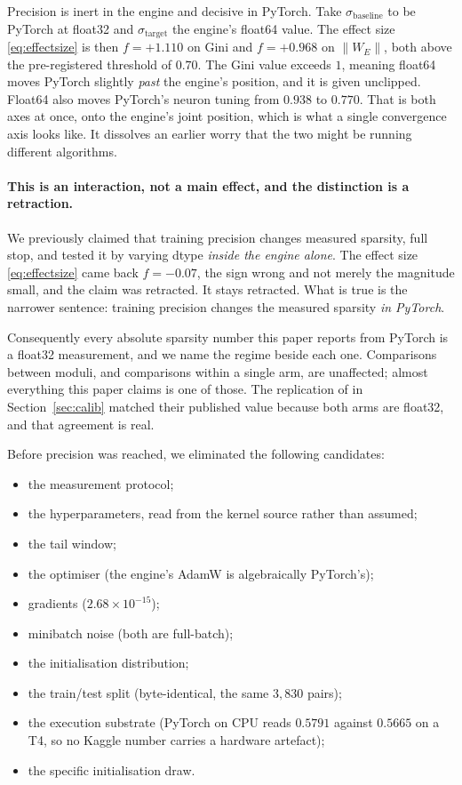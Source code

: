 Precision is inert in the engine and decisive in PyTorch. Take $\sigma_{\text{baseline}}$ to be
PyTorch at float32 and $\sigma_{\text{target}}$ the engine's float64 value. The effect size
\eqref{eq:effectsize} is then $f = +1.110$ on Gini and $f = +0.968$ on
$\lVert W_{E} \rVert$, both above the pre-registered threshold of $0.70$. The Gini value
exceeds $1$, meaning float64 moves PyTorch slightly \emph{past} the engine's position, and it
is given unclipped. Float64 also moves PyTorch's neuron tuning from $0.938$ to $0.770$. That
is both axes at once, onto the engine's joint position, which is what a single convergence
axis looks like. It dissolves an earlier worry that the two might be running different
algorithms.

\paragraph{This is an interaction, not a main effect, and the distinction is a retraction.}
We previously claimed that training precision changes measured sparsity, full stop, and tested
it by varying dtype \emph{inside the engine alone}. The effect size \eqref{eq:effectsize} came
back $f = -0.07$, the sign wrong and not merely the magnitude small, and the claim was
retracted. It stays retracted. What is true is the narrower sentence: training precision
changes the measured sparsity \emph{in PyTorch}.

Consequently every absolute sparsity number this paper reports from PyTorch is a float32 measurement,
and we name the regime beside each one. Comparisons between moduli, and comparisons within a
single arm, are unaffected; almost everything this paper claims is one of those. The
replication of \citet{nguyen2026dlogclock} in Section~\ref{sec:calib} matched their published
value because both arms are float32, and that agreement is real.

Before precision was reached, we eliminated the following candidates:
\begin{itemize}
  \item the measurement protocol;
  \item the hyperparameters, read from the kernel source rather than assumed;
  \item the tail window;
  \item the optimiser (the engine's AdamW is algebraically PyTorch's);
  \item gradients ($2.68 \times 10^{-15}$);
  \item minibatch noise (both are full-batch);
  \item the initialisation distribution;
  \item the train/test split (byte-identical, the same $3{,}830$ pairs);
  \item the execution substrate (PyTorch on CPU reads $0.5791$ against $0.5665$ on a T4, so
    no Kaggle number carries a hardware artefact);
  \item the specific initialisation draw.
\end{itemize}

